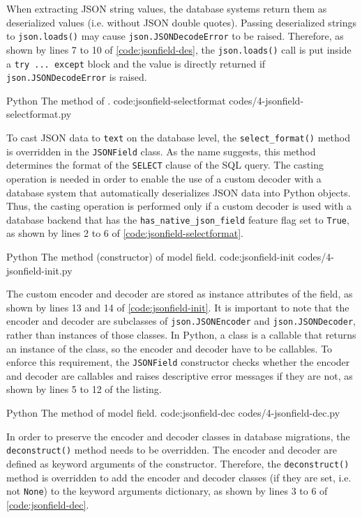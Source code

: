 When extracting JSON string values, the database systems return them as
deserialized values (i.e. without JSON double quotes). Passing deserialized
strings to \verb|json.loads()| may cause \verb|json.JSONDecodeError| to be
raised. Therefore, as shown by lines 7 to 10 of \autoref{code:jsonfield-des},
the \verb|json.loads()| call is put inside a \verb|try ... except| block and
the value is directly returned if \verb|json.JSONDecodeError| is raised.

\listing
{Python}
{The  method of .}
{code:jsonfield-selectformat}
{codes/4-jsonfield-selectformat.py}

To cast JSON data to \verb|text| on the database level, the
\verb|select_format()| method is overridden in the \verb|JSONField| class. As
the name suggests, this method determines the format of the \verb|SELECT|
clause of the SQL query. The casting operation is needed in order to enable the
use of a custom decoder with a database system that automatically deserializes
JSON data into Python objects. Thus, the casting operation is performed only if
a custom decoder is used with a database backend that has the
\verb|has_native_json_field| feature flag set to \verb|True|, as shown by lines
2 to 6 of \autoref{code:jsonfield-selectformat}.

\listing
{Python}
{The  method (constructor) of 
model field.}
{code:jsonfield-init}
{codes/4-jsonfield-init.py}

The custom encoder and decoder are stored as instance attributes of the field,
as shown by lines 13 and 14 of \autoref{code:jsonfield-init}. It is important
to note that the encoder and decoder are subclasses of \verb|json.JSONEncoder|
and \verb|json.JSONDecoder|, rather than instances of those classes. In Python,
a class is a callable that returns an instance of the class, so the encoder and
decoder have to be callables. To enforce this requirement, the \verb|JSONField|
constructor checks whether the encoder and decoder are callables and raises
descriptive error messages if they are not, as shown by lines 5 to 12 of the
listing.

\listing
{Python}
{The  method of  model field.}
{code:jsonfield-dec}
{codes/4-jsonfield-dec.py}

In order to preserve the encoder and decoder classes in database migrations,
the \verb|deconstruct()| method needs to be overridden. The encoder and decoder
are defined as keyword arguments of the constructor. Therefore, the
\verb|deconstruct()| method is overridden to add the encoder and decoder
classes (if they are set, i.e. not \verb|None|) to the keyword arguments
dictionary, as shown by lines 3 to 6 of \autoref{code:jsonfield-dec}.

